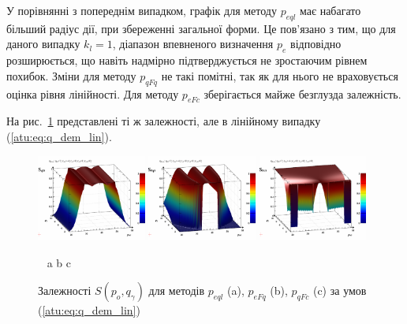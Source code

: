 У порівнянні з попереднім випадком, графік для методу
$ p_{eql} $ має набагато більший радіус дії, при збереженні загальної
форми. Це пов'язано з тим, що для даного випадку
$ k_l = 1 $, діапазон впевненого визначення
$ p_e $ відповідно розширюється, що навіть надмірно
підтверджується не зростаючим рівнем похибок. Зміни для методу
$ p_{qFq} $ не такі помітні, так як для нього не враховується оцінка
рівня лінійності. Для методу
$ p_{eFc} $ зберігається майже безглузда залежність.

На рис.~\ref{atu:f:qsl_S_po_qg_lin} представлені ті ж залежності,
але в лінійному випадку (\ref{atu:eq:q_dem_lin}).

\begin{figure}[htb!]
  \begin{center}
    \includegraphics[width=0.32\textwidth]{p/qls_pe-p_po_qg_Sql_lin.png}
    \hfill
    \includegraphics[width=0.32\textwidth]{p/qls_pe-p_po_qg_SFq_lin.png}
    \hfill
    \includegraphics[width=0.32\textwidth]{p/qls_pe-p_po_qg_SFc_lin.png}
  \end{center}
  \vspace{-1.0ex}
  \begin{center}
    ~ \hfill a \hfill\hfill b \hfill\hfill c \hfill ~
  \end{center}
  \vspace{-1.5ex}
  \caption{Залежності $S(p_o,q_\gamma)$ для методів $p_{eql}$ (a), $p_{eFq}$ (b), $p_{qFc}$ (c) за умов (\ref{atu:eq:q_dem_lin})}
  \label{atu:f:qsl_S_po_qg_lin}
\end{figure}

